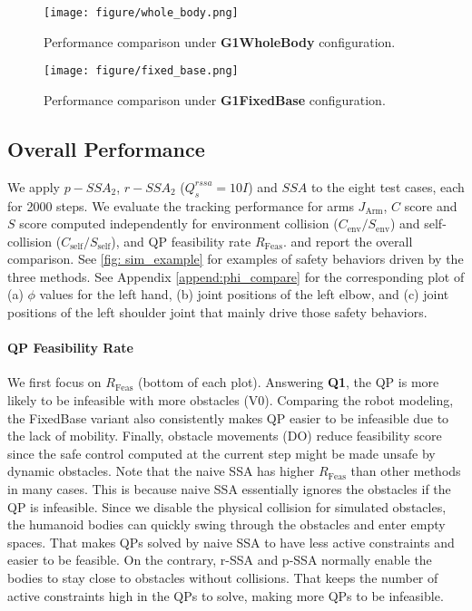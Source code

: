 \begin{figure*}[ht]
\centering
    \texttt{[image: figure/whole\_body.png]}
    \caption{Performance comparison under \textbf{G1WholeBody} configuration.}
\label{fig: whole_body}
\end{figure*}
\begin{figure*}[ht]
\centering
    \texttt{[image: figure/fixed\_base.png]}
    \caption{Performance comparison under \textbf{G1FixedBase} configuration.}
\label{fig: fixed_base}
\end{figure*}



\subsection{Overall Performance}



We apply $p-SSA_2$, $r-SSA_2$ ($Q^{rssa}_s=10I$) and $SSA$ to the eight test cases, each for 2000 steps.
We evaluate the tracking performance for arms $J_\mathrm{Arm}$, $C$ score and $S$ score computed independently for environment collision ($C_\mathrm{env}/S_\mathrm{env}$) and self-collision ($C_\mathrm{self}/S_\mathrm{self}$), and QP feasibility rate $R_\mathrm{Feas}$.
 and  report the overall comparison.
See \cref{fig: sim_example} for examples of safety behaviors driven by the three methods.
See Appendix \ref{append:phi_compare} for the corresponding plot of (a) $\phi$ values for the left hand, (b) joint positions of the left elbow, and (c) joint positions of the left shoulder joint that mainly drive those safety behaviors.

\paragraph{QP Feasibility Rate}
We first focus on $R_\mathrm{Feas}$ (bottom of each plot).
Answering \textbf{Q1}, the QP is more likely to be infeasible with more obstacles (V0).
Comparing the robot modeling, the FixedBase variant also consistently makes QP easier to be infeasible due to the lack of mobility.
Finally, obstacle movements (DO) reduce feasibility score since the safe control computed at the current step might be made unsafe by dynamic obstacles.
Note that the naive SSA has higher $R_\mathrm{Feas}$ than other methods in many cases.
This is because naive SSA essentially ignores the obstacles if the QP is infeasible.
Since we disable the physical collision for simulated obstacles, the humanoid bodies can quickly swing through the obstacles and enter empty spaces.
That makes QPs solved by naive SSA to have less active constraints and easier to be feasible.
On the contrary, r-SSA and p-SSA normally enable the bodies to stay close to obstacles without collisions.
That keeps the number of active constraints high in the QPs to solve, making more QPs to be infeasible.



